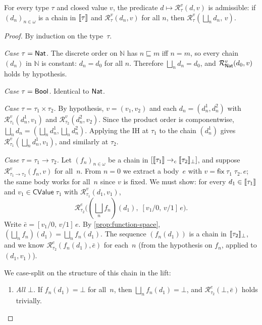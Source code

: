 \begin{lemma}
\label{lem:rel-val-admissible}
For every type $\tau$ and closed value $v$, the predicate $d \mapsto
\mathcal{R}^v_\tau(d, v)$ is admissible: if $(d_n)_{n \in \omega}$ is a
chain in $\llbracket \tau \rrbracket$ and $\mathcal{R}^v_\tau(d_n, v)$ for all $n$, then
$\mathcal{R}^v_\tau(\bigsqcup_n d_n,\, v)$.
\end{lemma}
\begin{proof}
By induction on the type~$\tau$.

\medskip\noindent
\emph{Case $\tau = \mathsf{Nat}$.}\;
The discrete order on $\mathbb{N}$ has $n \sqsubseteq m$ iff $n = m$,
so every chain $(d_n)$ in $\mathbb{N}$ is constant: $d_n = d_0$ for all
$n$.  Therefore $\bigsqcup_n d_n = d_0$, and
$\mathcal{R}^v_{\mathsf{Nat}}(d_0, v)$ holds by hypothesis.

\medskip\noindent
\emph{Case $\tau = \mathsf{Bool}$.}\;  Identical to $\mathsf{Nat}$.

\medskip\noindent
\emph{Case $\tau = \tau_1 \times \tau_2$.}\;
By hypothesis, $v = (v_1, v_2)$ and each $d_n = (d_n^1, d_n^2)$ with
$\mathcal{R}^v_{\tau_1}(d_n^1, v_1)$ and
$\mathcal{R}^v_{\tau_2}(d_n^2, v_2)$.  Since the product order is
componentwise, $\bigsqcup_n d_n = (\bigsqcup_n d_n^1, \bigsqcup_n
d_n^2)$.  Applying the IH at $\tau_1$ to the chain $(d_n^1)$ gives
$\mathcal{R}^v_{\tau_1}(\bigsqcup_n d_n^1, v_1)$, and similarly at
$\tau_2$.

\medskip\noindent
\emph{Case $\tau = \tau_1 \to \tau_2$.}\;
Let $(f_n)_{n \in \omega}$ be a chain in
$[\llbracket \tau_1 \rrbracket \to_c \llbracket \tau_2 \rrbracket_\bot]$, and suppose
$\mathcal{R}^v_{\tau_1 \to \tau_2}(f_n, v)$ for all~$n$.  From
$n = 0$ we extract a body~$e$ with
$v = \mathsf{fix}\;\tau_1\;\tau_2.\,e$; the same body works for all~$n$
since $v$ is fixed.  We must show: for every $d_1 \in \llbracket \tau_1 \rrbracket$
and $v_1 \in \mathsf{CValue}\;\tau_1$ with
$\mathcal{R}^v_{\tau_1}(d_1, v_1)$,
\[
  \mathcal{R}^e_{\tau_2}\!\bigl((\textstyle\bigsqcup_n f_n)(d_1),\;
  [v_1/0,\, v/1]\,e\bigr).
\]
Write $\bar{e} = [v_1/0,\, v/1]\,e$.  By
\cref{prop:function-space}, $(\bigsqcup_n f_n)(d_1) = \bigsqcup_n
f_n(d_1)$.  The sequence $(f_n(d_1))$ is a chain in
$\llbracket \tau_2 \rrbracket_\bot$, and we know
$\mathcal{R}^e_{\tau_2}(f_n(d_1), \bar{e})$ for each~$n$ (from
the hypothesis on $f_n$, applied to $(d_1, v_1)$).

We case-split on the structure of this chain in the lift:
\begin{enumerate}
  \item \emph{All $\bot$.}\;
    If $f_n(d_1) = \bot$ for all~$n$, then $\bigsqcup_n f_n(d_1) =
    \bot$, and $\mathcal{R}^e_{\tau_2}(\bot, \bar{e})$ holds trivially.


\end{enumerate}
\end{proof}
